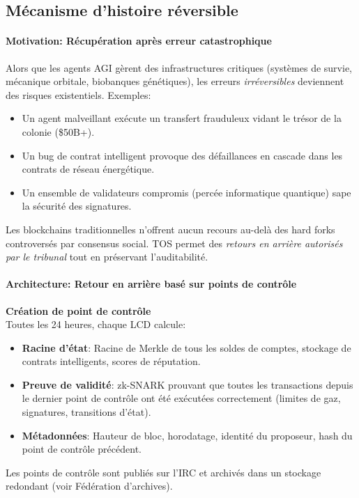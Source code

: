 \documentclass[11pt]{article}
\begin{document}
\subsection{Mécanisme d'histoire réversible}

\paragraph{Motivation: Récupération après erreur catastrophique}
Alors que les agents AGI gèrent des infrastructures critiques (systèmes de survie, mécanique orbitale, biobanques génétiques), les erreurs \emph{irréversibles} deviennent des risques existentiels. Exemples:
\begin{itemize}[noitemsep]
  \item Un agent malveillant exécute un transfert frauduleux vidant le trésor de la colonie (\$50B+).
  \item Un bug de contrat intelligent provoque des défaillances en cascade dans les contrats de réseau énergétique.
  \item Un ensemble de validateurs compromis (percée informatique quantique) sape la sécurité des signatures.
\end{itemize}
Les blockchains traditionnelles n'offrent aucun recours au-delà des hard forks controversés par consensus social. TOS permet des \emph{retours en arrière autorisés par le tribunal} tout en préservant l'auditabilité.

\paragraph{Architecture: Retour en arrière basé sur points de contrôle}
\textbf{Création de point de contrôle}\\
Toutes les 24 heures, chaque LCD calcule:
\begin{itemize}[noitemsep]
  \item \textbf{Racine d'état}: Racine de Merkle de tous les soldes de comptes, stockage de contrats intelligents, scores de réputation.
  \item \textbf{Preuve de validité}: zk-SNARK prouvant que toutes les transactions depuis le dernier point de contrôle ont été exécutées correctement (limites de gaz, signatures, transitions d'état).
  \item \textbf{Métadonnées}: Hauteur de bloc, horodatage, identité du proposeur, hash du point de contrôle précédent.
\end{itemize}
Les points de contrôle sont publiés sur l'IRC et archivés dans un stockage redondant (voir Fédération d'archives).
\end{document}

